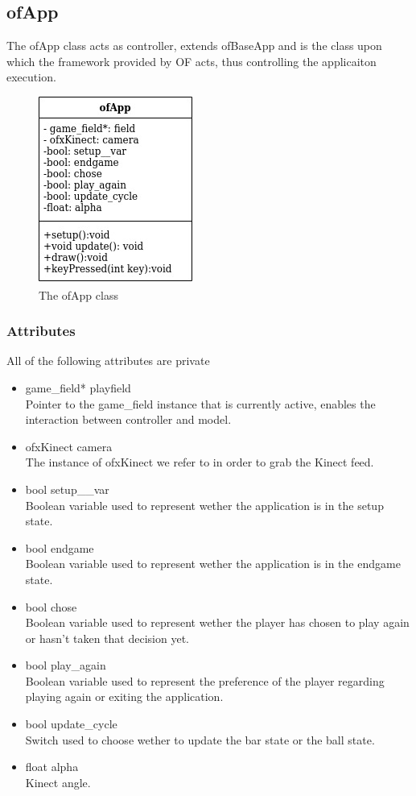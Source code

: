 \documentclass[]{article}
\begin{document}
\subsection{ofApp}
The ofApp class acts as controller, extends ofBaseApp and is the class upon which the framework provided by OF acts, thus controlling the applicaiton execution.
\begin{figure}[h!]
    \centering
    \includegraphics[scale=0.5]{ofApp.jpg}
    \caption{The ofApp class}
    \label{fig:ofApp class diagram }
\end{figure}
\subsubsection{Attributes}
All of the following attributes are private
	\begin{itemize}
		\item game\_field* playfield\\Pointer to the game\_field instance that is currently active, enables the interaction between controller and model.
		\item ofxKinect camera\\The instance of ofxKinect we refer to in order to grab the Kinect feed.
		\item bool setup\_\_var\\Boolean variable used to represent wether the application is in the setup state.
		\item bool endgame\\Boolean variable used to represent wether the application is in the endgame state.
		\item bool chose\\Boolean variable used to represent wether the player has chosen to play again or hasn't taken that decision yet.  
		\item bool play\_again\\Boolean variable used to represent the preference of the player regarding playing again or exiting the application.
		\item bool update\_cycle\\Switch used to choose wether to update the bar state or the ball state.
		\item float alpha\\Kinect angle.
	\end{itemize}
\end{document}
